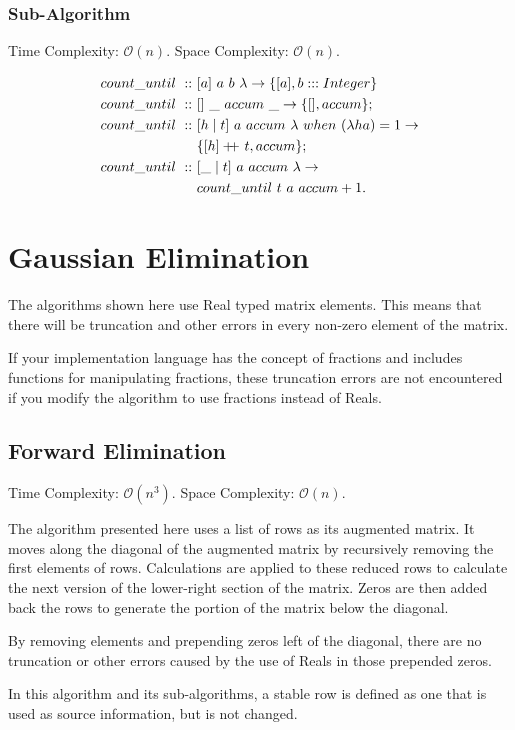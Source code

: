\documentclass[a4paper,10pt]{book}
\newcommand\doubleplus{+\kern-1.3ex+\kern0.8ex}
\begin{document}
\subsubsection{Sub-Algorithm}Time Complexity: $\mathcal{O}(n)$. Space Complexity: $\mathcal{O}(n)$.

\begin{align*}
count\_until\ ::\ &[a]\ a\ b\ \lambda\rightarrow \{[a],b:::Integer\}\\
count\_until\ ::\ &[]\ \_\ accum\ \_\rightarrow \{[],accum\};\\
count\_until\ ::\ &[h\mid t]\ a\ accum\ \lambda\ when\ (\lambda h a)=1\rightarrow\\
	&\{[h]\doubleplus t,accum\};\\
count\_until\ ::\ &[\_\mid t]\ a\ accum\ \lambda\rightarrow\\
	&count\_until\ t\ a\ accum+1.
\end{align*}

\section{Gaussian Elimination}
The algorithms shown here use Real typed matrix elements. This means that there will be truncation and other errors in every non-zero element of the matrix.

If your implementation language has the concept of fractions and includes functions for manipulating fractions, these truncation errors are not encountered if you modify the algorithm to use fractions instead of Reals.
\subsection{Forward Elimination}Time Complexity: $\mathcal{O}(n^3)$. Space Complexity: $\mathcal{O}(n)$.

The algorithm presented here uses a list of rows as its augmented matrix. It moves along the diagonal of the augmented matrix by recursively removing the first elements of rows. Calculations are applied to these reduced rows to calculate the next version of the lower-right section of the matrix. Zeros are then added back the rows to generate the portion of the matrix below the diagonal.

 By removing elements and prepending zeros left of the diagonal, there are no truncation or other errors caused by the use of Reals in those prepended zeros.

In this algorithm and its sub-algorithms, a stable row is defined as one that is used as source information, but is not changed.
\end{document}
